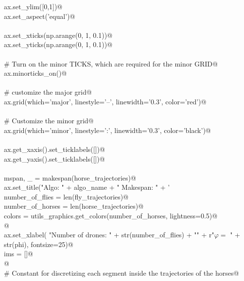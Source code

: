 \documentclass[12.0pt]{report}
\begin{document}
\begin{appendices}
\begin{flushleft}
\begin{list}{}{}
\mbox{}\verb@    ax.set_ylim([0,1])@\\
\mbox{}\verb@    ax.set_aspect('equal')@\\
\mbox{}\verb@@\\
\mbox{}\verb@    ax.set_xticks(np.arange(0, 1, 0.1))@\\
\mbox{}\verb@    ax.set_yticks(np.arange(0, 1, 0.1))@\\
\mbox{}\verb@@\\
\mbox{}\verb@    # Turn on the minor TICKS, which are required for the minor GRID@\\
\mbox{}\verb@    ax.minorticks_on()@\\
\mbox{}\verb@@\\
\mbox{}\verb@    # customize the major grid@\\
\mbox{}\verb@    ax.grid(which='major', linestyle='--', linewidth='0.3', color='red')@\\
\mbox{}\verb@@\\
\mbox{}\verb@    # Customize the minor grid@\\
\mbox{}\verb@    ax.grid(which='minor', linestyle=':', linewidth='0.3', color='black')@\\
\mbox{}\verb@@\\
\mbox{}\verb@    ax.get_xaxis().set_ticklabels([])@\\
\mbox{}\verb@    ax.get_yaxis().set_ticklabels([])@\\
\mbox{}\verb@@\\
\mbox{}\verb@    mspan, _ = makespan(horse_trajectories)@\\
\mbox{}\verb@    ax.set_title("Algo: " + algo_name + "  Makespan: " + '%.4f' % mspan , fontsize=25)@\\
\mbox{}\verb@@\\
\mbox{}\verb@    number_of_flies  = len(fly_trajectories)@\\
\mbox{}\verb@    number_of_horses = len(horse_trajectories)@\\
\mbox{}\verb@    colors           = utils_graphics.get_colors(number_of_horses, lightness=0.5)@\\
\mbox{}\verb@        @\\
\mbox{}\verb@    ax.set_xlabel( "Number of drones: " + str(number_of_flies) + "\n" + r"$\varphi=$ " + str(phi), fontsize=25)@\\
\mbox{}\verb@    ims                = []@\\
\mbox{}\verb@    @\\
\mbox{}\verb@    # Constant for discretizing each segment inside the trajectories of the horses@\\

\end{list}
\end{flushleft}
\end{appendices}
\end{document}
